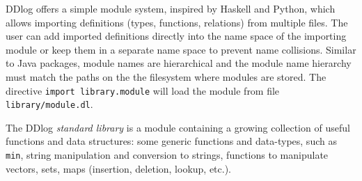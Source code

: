 DDlog offers a simple module system, inspired by Haskell and Python,
which allows importing definitions (types, functions, relations) from
multiple files.  The user can add imported definitions directly into the
name space of the importing module or keep them in a separate name space to
prevent name collisions.  Similar to Java packages, module names are
hierarchical and the module name hierarchy must match the paths on the
the filesystem where modules are stored.  The directive \texttt{import
  library.module} will load the module from file
\texttt{library/module.dl}.

The DDlog \emph{standard library} is a module containing a growing
collection of useful functions and data structures: some generic
functions and data-types, such as \texttt{min}, string manipulation
and conversion to strings, functions to manipulate vectors, sets, maps
(insertion, deletion, lookup, etc.).

